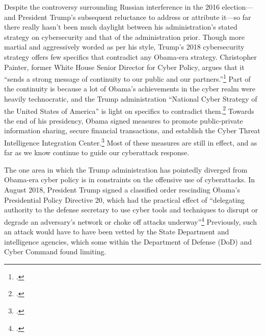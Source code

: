 \documentclass[11pt]{memoir}
\begin{document}
\begin{refsegment}
Despite the controversy surrounding Russian interference in the 2016 election---and President Trump's subsequent reluctance to address or attribute it---so far there really hasn't been much daylight between his administration's stated strategy on cybersecurity and that of the administration prior. Though more martial and aggressively worded as per his style, Trump's 2018 cybersecurity strategy offers few specifics that contradict any Obama-era strategy. Christopher Painter, former White House Senior Director for Cyber Policy, argues that it ``sends a strong message of continuity to our public and our partners.''\footcite[Painter also served at the State Department for six years as the Coordinator for Cyber Issues, which at the time was an Assistant Secretary level position. Since then, its status within the department has fluctuated wildly. Rex Tillerson, Trump's first Secretary of State, announced that he would abolish the office and merge it into State's Bureau of Economic Affairs. Then, just a few months later, he proposed creating an entirely new department bureau with a Senate-confirmed Assistant Secretary, possibly in response to criticism of his first decision. Though current Secretary Mike Pompeo appears to have more interest in cyber policy, the State Department still has not reestablished a high level cyber position.]{painter_white_2018} Part of the continuity is because a lot of Obama's achievements in the cyber realm were heavily technocratic, and the Trump administration ``National Cyber Strategy of the United States of America'' is light on specifics to contradict them.\footcite{guest_blogger_white_2018} Towards the end of his presidency, Obama signed measures to promote public-private information sharing, secure financial transactions, and establish the Cyber Threat Intelligence Integration Center.\footcite[Among other actions taken during the Obama presidency, these were sufficenct for PolitiFact to update its 2013 rating of his cyber-enforcement actions to ``Promise Kept.'']{carroll_obama_2016} Most of these measures are still in effect, and as far as we know continue to guide our cyberattack response.

The one area in which the Trump administration has pointedly diverged from Obama-era cyber policy is in constraints on the offensive use of cyberattacks. In August 2018, President Trump signed a classified order rescinding Obama's Presidential Policy Directive 20, which had the practical effect of ``delegating authority to the defense secretary to use cyber tools and techniques to disrupt or degrade an adversary's network or choke off attacks underway''\footcite{nakashima_trump_2018} Previously, such an attack would have to have been vetted by the State Department and intelligence agencies, which some within the Department of Defense (DoD) and Cyber Command found limiting.


\end{refsegment}
\end{document}
